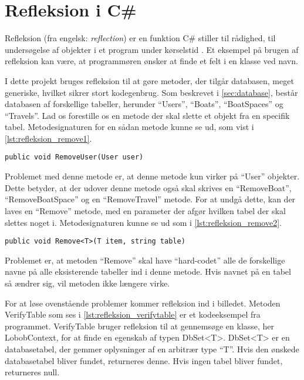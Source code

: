 \section{Refleksion i C\#}
\label{sec:refleksion}

Refleksion (fra engelsk: \textit{reflection}) er en funktion C\# stiller til rådighed, til undersøgelse af objekter i et program under kørselstid \cite{michaelis2012essential}. Et eksempel på brugen af refleksion kan være, at programmøren ønsker at finde et felt i en klasse ved navn.

I dette projekt bruges refleksion til at gøre metoder, der tilgår databasen, meget generiske, hvilket sikrer stort kodegenbrug. Som beskrevet i \cref{sec:database}, består databasen af forskellige tabeller, herunder \enquote{Users}, \enquote{Boats}, \enquote{BoatSpaces} og \enquote{Travels}. Lad os forestille os en metode der skal slette et objekt fra en specifik tabel. Metodesignaturen for en sådan metode kunne se ud, som vist i \cref{lst:refleksion_remove1}.

\begin{lstlisting}[label=lst:refleksion_remove1]
public void RemoveUser(User user)
\end{lstlisting}

Problemet med denne metode er, at denne metode kun virker på \enquote{User} objekter. Dette betyder, at der udover denne metode også skal skrives en \enquote{RemoveBoat}, \enquote{RemoveBoatSpace} og en \enquote{RemoveTravel} metode. For at undgå dette, kan der laves en \enquote{Remove} metode, med en parameter der afgør hvilken tabel der skal slettes noget i. Metodesignaturen kunne se ud som i \cref{lst:refleksion_remove2}.

\begin{lstlisting}[label=lst:refleksion_remove2]
public void Remove<T>(T item, string table)
\end{lstlisting}

Problemet er, at metoden \enquote{Remove} skal have \enquote{hard-codet} alle de forskellige navne på alle eksisterende tabeller ind i denne metode. Hvis navnet på en tabel så ændrer sig, vil metoden ikke længere virke.

For at løse ovenstående problemer kommer refleksion ind i billedet. Metoden VerifyTable som ses i \cref{lst:refleksion_verifytable} er et kodeeksempel fra programmet. VerifyTable bruger refleksion til at gennemsøge en klasse, her LobobContext, for at finde en egenskab af typen DbSet<T>. DbSet<T> er en databasetabel, der gemmer oplysninger af en arbitrær type \enquote{T}. Hvis den ønskede databasetabel bliver fundet, returneres denne. Hvis ingen tabel bliver fundet, returneres null.

